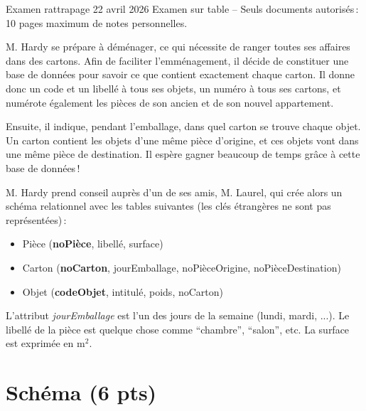 %
{Examen rattrapage 22 avril 2026}%
{Examen sur table -- Seuls documents autorisés\,: 10 pages maximum de notes personnelles.}%

M. Hardy se prépare à déménager, ce qui nécessite
de ranger toutes ses affaires dans des cartons.
Afin de faciliter l'emménagement, il décide de constituer
une base de données pour savoir ce que contient
exactement chaque carton. Il donne donc un code
et un libellé à tous ses objets, un numéro à
tous ses cartons, et numérote également
les pièces de son ancien et de son nouvel appartement.


Ensuite, il indique, pendant l'emballage, dans quel
carton se trouve chaque objet. Un carton
contient les objets d'une même pièce d'origine, et
ces objets vont dans une même pièce de destination.
Il espère gagner beaucoup de temps grâce à cette base de données\,!


M. Hardy prend conseil auprès d'un de ses amis, M. Laurel, qui
crée alors un schéma relationnel avec les tables suivantes
(les clés étrangères ne sont pas représentées)\,:

      \begin{itemize}
        \item Pièce (\textbf{noPièce}, libellé, surface)
        \item Carton (\textbf{noCarton}, jourEmballage, noPièceOrigine,
                            noPièceDestination)
        \item  Objet (\textbf{codeObjet}, intitulé, poids,
                     noCarton)
       \end{itemize}

L'attribut \textit{jourEmballage} est l'un
des jours de la semaine (lundi, mardi, ...). Le libellé
de la pièce est quelque chose comme ``chambre'', ``salon'',
etc. La surface est exprimée en m$^2$.

\section{Schéma (6 pts)}

